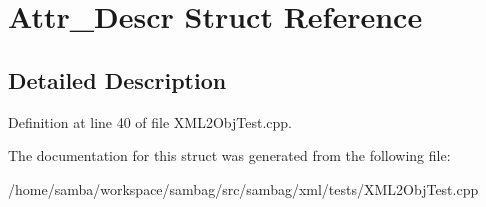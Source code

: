 \hypertarget{struct_attr___descr}{
\section{Attr\_\-Descr Struct Reference}
\label{struct_attr___descr}
}


\subsection{Detailed Description}


Definition at line 40 of file XML2ObjTest.cpp.



The documentation for this struct was generated from the following file:\begin{DoxyCompactItemize}
\item 
/home/samba/workspace/sambag/src/sambag/xml/tests/XML2ObjTest.cpp\end{DoxyCompactItemize}
